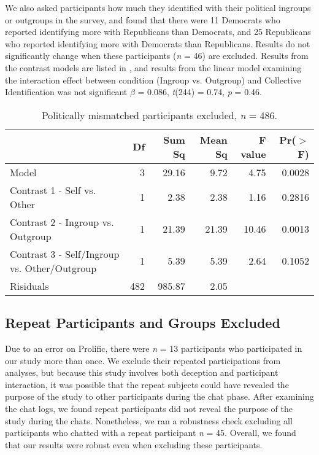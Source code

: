 \documentclass[12pt,]{article}
\begin{document}
We also asked participants how much they identified with their political ingroups or outgroups in the survey, and found that there were 11 Democrats who reported identifying more with Republicans than Democrats, and 25 Republicans who reported identifying more with Democrats than Republicans. Results do not significantly change when these participants (\emph{n} = 46) are excluded.  Results from the contrast models are listed in , and results from the linear model examining the interaction effect between condition (Ingroup vs. Outgroup) and Collective Identification was not significant $\beta$ = 0.086, \emph{t}(244) = 0.74, \emph{p} = 0.46. 

\vspace{0.6cm}

\begin{table}[ht]
\centering
\begin{tabular}{lrrrrr}
  \hline
 & Df & Sum Sq & Mean Sq & F value & Pr($>$F) \\ 
  \hline
Model & 3 & 29.16 & 9.72 & 4.75 & 0.0028 \\ 
  Contrast 1 - Self vs. Other & 1 & 2.38 & 2.38 & 1.16 & 0.2816 \\ 
  Contrast 2 - Ingroup vs. Outgroup & 1 & 21.39 & 21.39 & 10.46 & 0.0013 \\ 
  Contrast 3 - Self/Ingroup vs. Other/Outgroup & 1 & 5.39 & 5.39 & 2.64 & 0.1052 \\ 
  Risiduals & 482 & 985.87 & 2.05 &  &  \\ 
   \hline
\end{tabular}
\caption{Politically mismatched participants excluded, \emph{n} = 486.} 
\label{mismatch}
\end{table}

\vspace{0.3cm}



\newpage
\subsection{Repeat Participants and Groups Excluded}
\label{appendix:exclude}

Due to an error on Prolific, there were \emph{n} = 13 participants who participated in our study more than once. We exclude their repeated participations from analyses, but because this study involves both deception and participant interaction, it was possible that the repeat subjects could have revealed the purpose of the study to other participants during the chat phase. After examining the chat logs, we found repeat participants did not reveal the purpose of the study during the chats. Nonetheless, we ran a robustness check excluding all participants who chatted with a repeat participant \emph{n} = 45. Overall, we found that our results were robust even when excluding these participants.  
\end{document}
